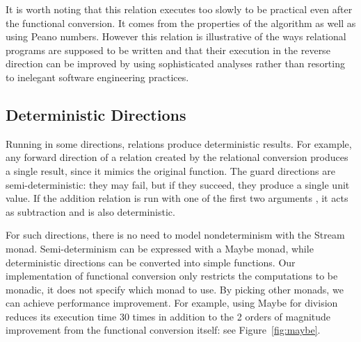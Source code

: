 It is worth noting that this relation executes too slowly to be practical even after the functional conversion.
It comes from the properties of the algorithm as well as using Peano numbers.
However this relation is illustrative of the ways relational programs are supposed to be written and that their execution in the reverse direction can be improved by using sophisticated analyses rather than resorting to inelegant software engineering practices.



\subsection{Deterministic Directions}

Running in some directions, relations produce deterministic results.
For example, any forward direction of a relation created by the relational conversion produces a single result, since it mimics the original function.
The guard directions are semi-deterministic: they may fail, but if they succeed, they produce a single unit value.
If the addition relation is run with one of the first two arguments \outm, it acts as subtraction and is also deterministic.

For such directions, there is no need to model nondeterminism with the Stream monad.
Semi-determinism can be expressed with a Maybe monad, while deterministic directions can be converted into simple functions.
Our implementation of functional conversion only restricts the computations to be monadic, it does not specify which monad to use.
By picking other monads, we can achieve performance improvement.
For example, using Maybe for division reduces its execution time $30$ times in addition to the 2 orders of magnitude improvement from the functional conversion itself: see Figure~\ref{fig:maybe}.

